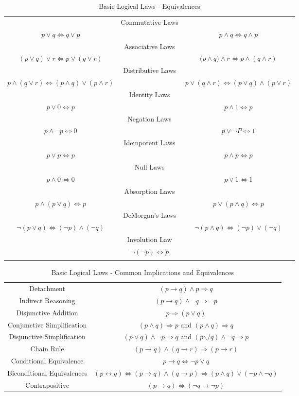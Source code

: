 \documentclass[10pt,]{book}
\theoremstyle{plain}
\theoremstyle{definition}
\theoremstyle{definition}
\theoremstyle{definition}
\theoremstyle{definition}
\newcommand{\hrulemedium}{\noalign{\hrule height 0.07em}}
\begin{document}
\leavevmode%
\begin{table}
\centering
\begin{tabular}{ccc}
&Commutative Laws&\tabularnewline[0pt]
 \(p \lor  q\Leftrightarrow q\lor p\)  & &  
\(p \land q\Leftrightarrow q \land p\)&\tabularnewline\hrulemedium
&Associative Laws&\tabularnewline[0pt]
\((p \lor  q) \lor r \Leftrightarrow  p \lor  (q \lor  r)\)  & &  (\(p \land q) \land r\Leftrightarrow p \land  (q \land  r)\)&\tabularnewline\hrulemedium
&Distributive Laws&\tabularnewline[0pt]

\(p \land  (q \lor  r) \Leftrightarrow  (p \land  q ) \lor  (p \land  r)\)   & &     \(p \lor  (q \land  r) \Leftrightarrow  (p \lor  q) \land
 (p \lor r)\) &\tabularnewline\hrulemedium
&Identity Laws&\tabularnewline[0pt]
   \(p \lor  0\Leftrightarrow p\)  & & \(p \land  1 \Leftrightarrow p\)&\tabularnewline\hrulemedium
&Negation Laws&\tabularnewline[0pt]
 \(p\land \neg p\Leftrightarrow 0\) & & 
\(p\lor \neg P\Leftrightarrow 1\)&\tabularnewline\hrulemedium
&Idempotent Laws&\tabularnewline[0pt]
\(p \lor  p \Leftrightarrow p\) & &  \(p\land p \Leftrightarrow p\)&\tabularnewline\hrulemedium
&Null Laws&\tabularnewline[0pt]
\(p \land 0 \Leftrightarrow 0\) & & \(p \lor  1 \Leftrightarrow 1\)&\tabularnewline\hrulemedium
&Absorption Laws&\tabularnewline[0pt]
\(p \land (p\lor  q)\Leftrightarrow p\) & &
 \(p \lor  (p \land  q) \Leftrightarrow  p\)&\tabularnewline\hrulemedium
&DeMorgan's Laws&\tabularnewline[0pt]
\(\neg (p \lor  q) \Leftrightarrow  (\neg p) \land  (\neg q)\)& & \(\neg (p \land  q) \Leftrightarrow  (\neg p) \lor  (\neg q)\)&\tabularnewline\hrulemedium
&Involution Law&\tabularnewline[0pt]
& \(\neg (\neg p)\Leftrightarrow p\)&\tabularnewline\hrulemedium
\end{tabular}
\caption{Basic Logical Laws - Equivalences\label{table-equivalences}}
\end{table}
\leavevmode%
\begin{table}
\centering
\begin{tabular}{cc}
Detachment&
\((p \rightarrow  q) \land  p\Rightarrow  q\)\tabularnewline\hrulemedium
Indirect Reasoning&
\((p \to  q) \land  \neg q \Rightarrow  \neg p\)\tabularnewline\hrulemedium
Disjunctive Addition&
\(p\Rightarrow (p\lor q)\)\tabularnewline\hrulemedium
Conjunctive Simplification&
 \((p \land  q) \Rightarrow  p\) and \((p \land  q) \Rightarrow  q\)\tabularnewline\hrulemedium
Disjunctive Simplification&
 \((p \lor  q) \land  \neg p \Rightarrow  q\) and \((p\text{$\backslash $/} q) \land \neg q\Rightarrow p\)\tabularnewline\hrulemedium
Chain Rule&
\((p \to  q) \land  ( q \rightarrow  r) \Rightarrow  (p\to  r)\)
\tabularnewline\hrulemedium
Conditional Equivalence&
 \(p \rightarrow  q \Leftrightarrow  \neg p \lor  q\)\tabularnewline\hrulemedium
Biconditional Equivalences&
 \((p \leftrightarrow  q) \Leftrightarrow  (p\rightarrow q) \land  (q \rightarrow  p)\Leftrightarrow (p \land  q) \lor  (\neg p \land  \neg q)\)\tabularnewline\hrulemedium
Contrapositive&
 \((p\to q) \Leftrightarrow (\neg q \to \neg p)\)
\end{tabular}
\caption{Basic Logical Laws - Common Implications and Equivalences\label{table-implications}}
\end{table}
\end{document}
